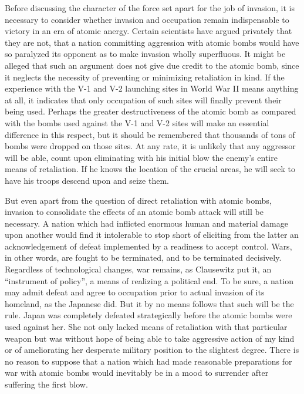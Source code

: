 Before discussing the character of the force set apart for the job of invasion, it is necessary to consider whether invasion and occupation remain indispensable to victory in an era of atomic anergy. Certain scientists have argued privately that they are not, that a nation committing aggression with atomic bombs would have so paralyzed its opponent as to make invasion wholly superfluous. It might be alleged that such an argument does not give due credit to the atomic bomb, since it neglects the necessity of preventing or minimizing retaliation in kind. If the experience with the V-1 and V-2 launching sites in World War II means anything at all, it indicates that only occupation of such sites will finally prevent their being used. Perhaps the greater destructiveness of the atomic bomb as compared with the bombs used against the V-1 and V-2 sites will make an essential difference in this respect, but it should be remembered that thousands of tons of bombs were dropped on those sites. At any rate, it is unlikely that any aggressor will be able, count upon eliminating with his initial blow the enemy's entire means of retaliation. If he knows the location of the crucial areas, he will seek to have his troops descend upon and seize them.

But even apart from the question of direct retaliation with atomic bombs, invasion to consolidate the effects of an atomic bomb attack will still be necessary. A nation which had inflicted enormous human and material damage upon another would find it intolerable to stop short of eliciting from the latter an acknowledgement of defeat implemented by a readiness to accept control. Wars, in other words, are fought to be terminated, and to be terminated decisively. Regardless of technological changes, war remains, as Clausewitz put it, an ``instrument of policy'', a means of realizing a political end. To be sure, a nation may admit defeat and agree to occupation prior to actual invasion of its homeland, as the Japanese did. But it by no means follows that such will be the rule. Japan was completely defeated strategically before the atomic bombs were used against her. She not only lacked means of retaliation with that particular weapon but was without hope of being able to take aggressive action of my kind or of ameliorating her desperate military position to the slightest degree. There is no reason to suppose that a nation which had made reasonable preparations for war with atomic bombs would inevitably be in a mood to surrender after suffering the first blow.

